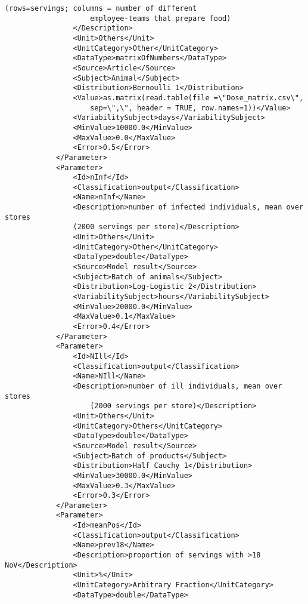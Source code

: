 \documentclass[a4paper]{report}
\begin{document}
\begin{lstlisting}[language=RAKIP, caption={Example of StudySample}]
                    (rows=servings; columns = number of different
                    employee-teams that prepare food)
                </Description>
                <Unit>Others</Unit>
                <UnitCategory>Other</UnitCategory>
                <DataType>matrixOfNumbers</DataType>
                <Source>Article</Source>
                <Subject>Animal</Subject>
                <Distribution>Bernoulli 1</Distribution>
                <Value>as.matrix(read.table(file =\"Dose_matrix.csv\",
                    sep=\",\", header = TRUE, row.names=1))</Value>
                <VariabilitySubject>days</VariabilitySubject>
                <MinValue>10000.0</MinValue>
                <MaxValue>0.0</MaxValue>
                <Error>0.5</Error>
            </Parameter>
            <Parameter>
                <Id>nInf</Id>
                <Classification>output</Classification>
                <Name>nInf</Name>
                <Description>number of infected individuals, mean over stores
                (2000 servings per store)</Description>
                <Unit>Others</Unit>
                <UnitCategory>Other</UnitCategory>
                <DataType>double</DataType>
                <Source>Model result</Source>
                <Subject>Batch of animals</Subject>
                <Distribution>Log-Logistic 2</Distribution>
                <VariabilitySubject>hours</VariabilitySubject>
                <MinValue>20000.0</MinValue>
                <MaxValue>0.1</MaxValue>
                <Error>0.4</Error>
            </Parameter>
            <Parameter>
                <Id>NIll</Id>
                <Classification>output</Classification>
                <Name>NIll</Name>
                <Description>number of ill individuals, mean over stores
                    (2000 servings per store)</Description>
                <Unit>Others</Unit>
                <UnitCategory>Others</UnitCategory>
                <DataType>double</DataType>
                <Source>Model result</Source>
                <Subject>Batch of products</Subject>
                <Distribution>Half Cauchy 1</Distribution>
                <MinValue>30000.0</MinValue>
                <MaxValue>0.3</MaxValue>
                <Error>0.3</Error>
            </Parameter>
            <Parameter>
                <Id>meanPos</Id>
                <Classification>output</Classification>
                <Name>prev18</Name>
                <Description>proportion of servings with >18 NoV</Description>
                <Unit>%</Unit>
                <UnitCategory>Arbitrary Fraction</UnitCategory>
                <DataType>double</DataType>

\end{lstlisting}
\end{document}
